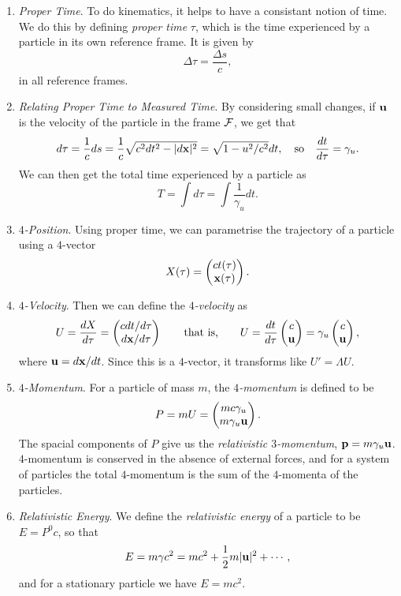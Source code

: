 \documentclass{scrartcl}
\theoremstyle{definition}
\begin{document}
\begin{enumerate}
	\item \emph{Proper Time}. To do kinematics, it helps to have a consistant notion of time. We do this by defining \emph{proper time} $\tau$, which is the time experienced by a particle in its own reference frame. It is given by
	$$
	\Delta \tau = \frac{\Delta s}{c},
	$$
	in all reference frames.
	\item \emph{Relating Proper Time to Measured Time}. By considering small changes, if $\mathbf{u}$ is the velocity of the particle in the frame $\mathcal{F}$, we get that
	$$
	d \tau = \frac{1}{c} d s = \frac{1}{c} \sqrt{c^2 d t^2 - |d\mathbf{x}|^2} = \sqrt{1 - u^2/c^2} d t, \quad \text{so} \quad \frac{dt}{d \tau} = \gamma_u.
$$
We can then get the total time experienced by a particle as
$$
T = \int d \tau = \int \frac{1}{\gamma_u} d t.
$$
\item \emph{$4$-Position}. Using proper time, we can parametrise the trajectory of a particle using a $4$-vector
$$
X(\tau) = \begin{pmatrix}
	ct(\tau) \\
	\mathbf{x}(\tau)
\end{pmatrix}.
$$
\item \emph{$4$-Velocity}. Then we can define the \emph{$4$-velocity} as
$$
U = \frac{dX}{d \tau} = \begin{pmatrix}
	c dt/d\tau \\
	d \mathbf{x} / d \tau
\end{pmatrix} \quad \quad \text{that is,} \quad \quad U = \frac{dt}{d\tau} \begin{pmatrix}
	c \\ \mathbf{u}
\end{pmatrix} = \gamma_u \begin{pmatrix}
	c \\ \mathbf{u}
\end{pmatrix},
$$
where $\mathbf{u} = d \mathbf{x}/ dt$. Since this is a $4$-vector, it transforms like $U' = \Lambda U$. 
\item \emph{$4$-Momentum}. For a particle of mass $m$, the \emph{$4$-momentum} is defined to be
$$
P = mU = \begin{pmatrix}
	mc \gamma_u \\
	m \gamma_u \mathbf{u}
\end{pmatrix}.
$$
The spacial components of $P$ give us the \emph{relativistic $3$-momentum}, $\mathbf{p} = m \gamma_u \mathbf{u}$. $4$-momentum is conserved in the absence of external forces, and for a system of particles the total $4$-momentum is the sum of the $4$-momenta of the particles.
\item \emph{Relativistic Energy}. We define the \emph{relativistic energy} of a particle to be $E = P^0 c$, so that
$$
E = m \gamma c^2 = mc^2 + \frac{1}{2} m |\mathbf{u}|^2 + \cdots,
$$
and for a stationary particle we have $E = mc^2$. 


\end{enumerate}
\end{document}
